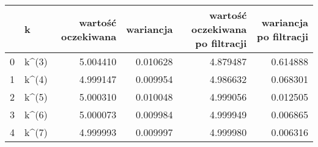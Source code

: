 \begin{tabular}{llrrrr}
\toprule
{} &      k &  wartość oczekiwana &  wariancja &  wartość oczekiwana po filtracji &  wariancja po filtracji \\
\midrule
0 &  k\textasciicircum (3) &            5.004410 &   0.010628 &                         4.879487 &                0.614888 \\
1 &  k\textasciicircum (4) &            4.999147 &   0.009954 &                         4.986632 &                0.068301 \\
2 &  k\textasciicircum (5) &            5.000310 &   0.010048 &                         4.999056 &                0.012505 \\
3 &  k\textasciicircum (6) &            5.000073 &   0.009984 &                         4.999949 &                0.006865 \\
4 &  k\textasciicircum (7) &            4.999993 &   0.009997 &                         4.999980 &                0.006316 \\
\bottomrule
\end{tabular}

